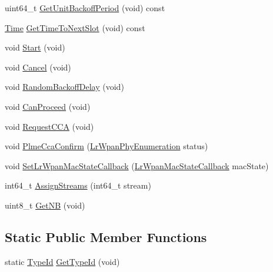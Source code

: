 \begin{DoxyCompactItemize}
\item 
uint64\+\_\+t \hyperlink{classns3_1_1LrWpanCsmaCa_a0ff6f47b6f3e5466d362404f43ea92d6}{Get\+Unit\+Backoff\+Period} (void) const 
\item 
\hyperlink{classns3_1_1Time}{Time} \hyperlink{classns3_1_1LrWpanCsmaCa_ad3cdb2f2a1b78b413762a35c2602e9a2}{Get\+Time\+To\+Next\+Slot} (void) const 
\item 
void \hyperlink{classns3_1_1LrWpanCsmaCa_a56a6a13db485d94a8449d0823985b503}{Start} (void)
\item 
void \hyperlink{classns3_1_1LrWpanCsmaCa_a7de1debe254ffb064e3c35b159b694a9}{Cancel} (void)
\item 
void \hyperlink{classns3_1_1LrWpanCsmaCa_a21224101ec7187a7f9560a36172841b8}{Random\+Backoff\+Delay} (void)
\item 
void \hyperlink{classns3_1_1LrWpanCsmaCa_a9f7dda9d4ebf114402edcd945fd310ef}{Can\+Proceed} (void)
\item 
void \hyperlink{classns3_1_1LrWpanCsmaCa_ac471353c2a9103e1d081f8690a0415a6}{Request\+C\+CA} (void)
\item 
void \hyperlink{classns3_1_1LrWpanCsmaCa_a1bf49464e78fc85f292ce927f79f5d84}{Plme\+Cca\+Confirm} (\hyperlink{group__lr-wpan_ga6494269d13d45c511a07b7ccbb1de754}{Lr\+Wpan\+Phy\+Enumeration} status)
\item 
void \hyperlink{classns3_1_1LrWpanCsmaCa_ac80ff958d01e3316221997a13b537335}{Set\+Lr\+Wpan\+Mac\+State\+Callback} (\hyperlink{group__lr-wpan_ga592f91469c801150297e7f1ac939b7ff}{Lr\+Wpan\+Mac\+State\+Callback} mac\+State)
\item 
int64\+\_\+t \hyperlink{classns3_1_1LrWpanCsmaCa_afaeeb5b41f4ada6ea6df37e6c7761ada}{Assign\+Streams} (int64\+\_\+t stream)
\item 
uint8\+\_\+t \hyperlink{classns3_1_1LrWpanCsmaCa_a992fb1130233ad8d55cfb7d80f581b9f}{Get\+NB} (void)
\end{DoxyCompactItemize}
\subsection*{Static Public Member Functions}
\begin{DoxyCompactItemize}
\item 
static \hyperlink{classns3_1_1TypeId}{Type\+Id} \hyperlink{classns3_1_1LrWpanCsmaCa_a0349edb5962932b7e60b89adda85a4c0}{Get\+Type\+Id} (void)
\end{DoxyCompactItemize}
